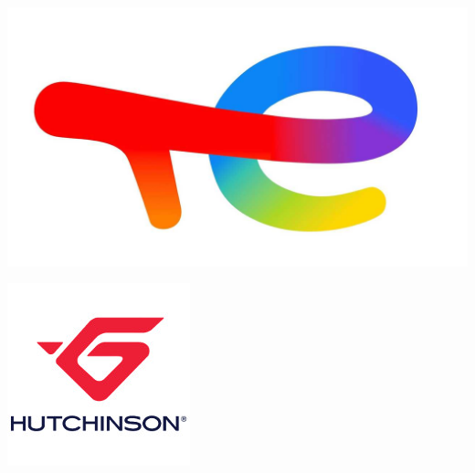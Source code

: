 \documentclass{beamer}
\begin{document}
{\begin{center}
\begin{minipage}{.193\textwidth}
    \end{minipage}%
    \begin{minipage}{.193\textwidth}
        \centering
    \includegraphics[width=.6\linewidth]{img/new_images/total_energies.jpg}
    \end{minipage}
    \begin{minipage}{.193\textwidth}
        \includegraphics[width=.6\linewidth]{img/new_images/hutchinson.png}
    \end{minipage}
\end{center}
}

\frame{\titlepage}
\end{document}
